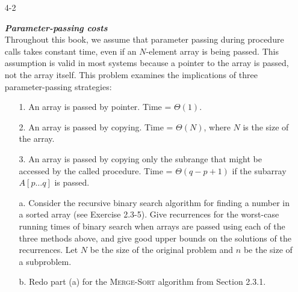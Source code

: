 \documentclass{report}
\begin{document}
\begin{enumerate}
\newpage

\item[4{-}2]{\textbf{\emph{Parameter-passing costs}}\\
Throughout this book, we assume that parameter passing during procedure calls
takes constant time, even if an $N$-element array is being passed. This
assumption is valid in most systems because a pointer to the array is passed,
not the array itself.  This problem examines the implications of three
parameter-passing strategies:

\begin{enumerate}
  \item[1.] An array is passed by pointer. Time = $\Theta(1)$.
  \item[2.] An array is passed by copying. Time = $\Theta(N)$, where $N$ is the size
    of the array.
  \item[3.] An array is passed by copying only the subrange that might be accessed
    by the called procedure. Time = $\Theta(q - p + 1)$ if the subarray $A[p
    \dots q]$ is passed.
\end{enumerate}

\begin{enumerate}
  \item[a.] Consider the recursive binary search algorithm for finding a number
    in a sorted array (see Exercise 2.3-5). Give recurrences for the worst-case
    running times of binary search when arrays are passed using each of the
    three methods above, and give good upper bounds on the solutions of the
    recurrences. Let $N$ be the size of the original problem and $n$ be the size
    of a subproblem.
  \item[b.] Redo part (a) for the \textsc{Merge-Sort} algorithm from Section
    2.3.1.
\end{enumerate}
}


\end{enumerate}
\end{document}
